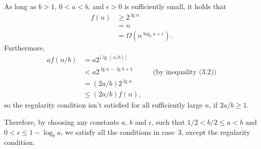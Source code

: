 As long as $b>1$, $0<a<b$, and $\epsilon>0$ is sufficiently small, it holds that
\begin{align*}
    f(n) &\ge 2^{\lg n} \\
    &= n \\
    &= \Omega(n^{\log_ba+\epsilon}).
\end{align*}
Furthermore,
\begin{align*}
    af(n/b) &= a2^{\lceil\lg(n/b)\rceil} \\
    &< a2^{\lg n-\lg b+1} && \text{(by inequality (3.2))} \\
    &= (2a/b)2^{\lg n} \\
    &\le (2a/b)f(n),
\end{align*}
so the regularity condition isn't satisfied for all sufficiently large $n$, if $2a/b\ge1$.

Therefore, by choosing any constants $a$, $b$ and $\epsilon$, such that $1/2<b/2\le a<b$ and $0<\epsilon\le1-\log_ba$, we satisfy all the conditions in case~3, except the regularity condition.
